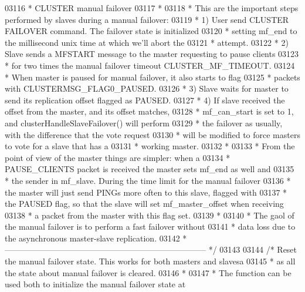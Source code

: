 \begin{DoxyCode}
{{{{{{{{{{{{{{{{{{{{{{{{{{{{{{{{{{{{{{{{{{{{{{{{{{{{{{{{{03116 \textcolor{comment}{ * CLUSTER manual failover}
03117 \textcolor{comment}{ *}
03118 \textcolor{comment}{ * This are the important steps performed by slaves during a manual failover:}
03119 \textcolor{comment}{ * 1) User send CLUSTER FAILOVER command. The failover state is initialized}
03120 \textcolor{comment}{ *    setting mf\_end to the millisecond unix time at which we'll abort the}
03121 \textcolor{comment}{ *    attempt.}
03122 \textcolor{comment}{ * 2) Slave sends a MFSTART message to the master requesting to pause clients}
03123 \textcolor{comment}{ *    for two times the manual failover timeout CLUSTER\_MF\_TIMEOUT.}
03124 \textcolor{comment}{ *    When master is paused for manual failover, it also starts to flag}
03125 \textcolor{comment}{ *    packets with CLUSTERMSG\_FLAG0\_PAUSED.}
03126 \textcolor{comment}{ * 3) Slave waits for master to send its replication offset flagged as PAUSED.}
03127 \textcolor{comment}{ * 4) If slave received the offset from the master, and its offset matches,}
03128 \textcolor{comment}{ *    mf\_can\_start is set to 1, and clusterHandleSlaveFailover() will perform}
03129 \textcolor{comment}{ *    the failover as usually, with the difference that the vote request}
03130 \textcolor{comment}{ *    will be modified to force masters to vote for a slave that has a}
03131 \textcolor{comment}{ *    working master.}
03132 \textcolor{comment}{ *}
03133 \textcolor{comment}{ * From the point of view of the master things are simpler: when a}
03134 \textcolor{comment}{ * PAUSE\_CLIENTS packet is received the master sets mf\_end as well and}
03135 \textcolor{comment}{ * the sender in mf\_slave. During the time limit for the manual failover}
03136 \textcolor{comment}{ * the master will just send PINGs more often to this slave, flagged with}
03137 \textcolor{comment}{ * the PAUSED flag, so that the slave will set mf\_master\_offset when receiving}
03138 \textcolor{comment}{ * a packet from the master with this flag set.}
03139 \textcolor{comment}{ *}
03140 \textcolor{comment}{ * The gaol of the manual failover is to perform a fast failover without}
03141 \textcolor{comment}{ * data loss due to the asynchronous master-slave replication.}
03142 \textcolor{comment}{ * -------------------------------------------------------------------------- */}
03143 
03144 \textcolor{comment}{/* Reset the manual failover state. This works for both masters and slavesa}
03145 \textcolor{comment}{ * as all the state about manual failover is cleared.}
03146 \textcolor{comment}{ *}
03147 \textcolor{comment}{ * The function can be used both to initialize the manual failover state at}
}}}}}}}}}}}}}}}}}}}}}}}}}}}}}}}}}}}}}}}}}}}}}}}}}}}}}}}}}
\end{DoxyCode}
